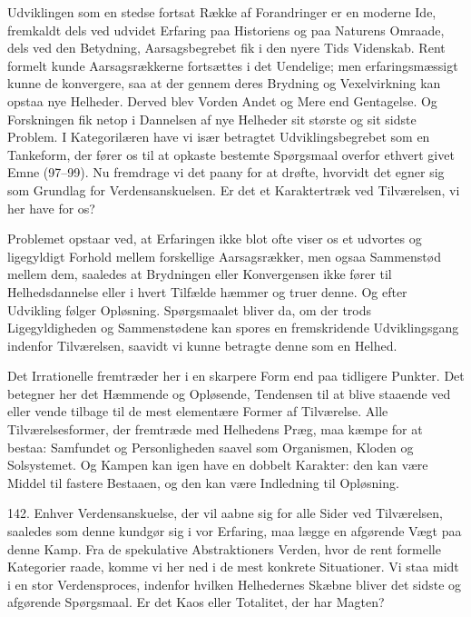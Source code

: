 \documentclass[12pt,a4paper]{book}
\newcommand{\apage}[1]{\marginnote{\footnotesize\textit{[#1]}}}
\begin{document}
Udviklingen som en stedse fortsat Række af Forandringer er en moderne Ide, fremkaldt dels
ved udvidet Erfaring paa Historiens og paa Naturens Omraade, dels ved den Betydning,
Aarsagsbegrebet fik i den nyere Tids Videnskab. Rent formelt kunde Aarsagsrækkerne
fortsættes i det Uendelige; men erfaringsmæssigt kunne de konvergere, saa at der gennem
deres Brydning og Vexelvirkning kan opstaa nye Helheder. Derved blev Vorden Andet og Mere
end Gentagelse. Og Forskningen fik netop i Dannelsen af nye Helheder sit største og sit
sidste Problem. I Kategorilæren have vi især betragtet Udviklingsbegrebet som en Tankeform,
der fører os til at opkaste bestemte Spørgsmaal overfor ethvert givet Emne (97--99). Nu
fremdrage vi det paany for at drøfte, hvorvidt det egner sig som Grundlag for
Verdensanskuelsen. Er det et Karaktertræk ved Tilværelsen, vi her have for os?

Problemet opstaar ved, at Erfaringen ikke blot ofte viser os et udvortes og ligegyldigt
Forhold mellem forskellige Aarsagsrækker, men ogsaa Sammenstød mellem dem, saaledes at
Brydningen eller Konvergensen ikke fører til Helhedsdannelse eller i hvert Tilfælde hæmmer
og truer denne. Og efter Udvikling følger Opløsning. Spørgsmaalet bliver da, om der trods
Ligegyldigheden og Sammenstødene kan \apage{340} spores en fremskridende Udviklingsgang indenfor
Tilværelsen, saavidt vi kunne betragte denne som en Helhed.

Det Irrationelle fremtræder her i en skarpere Form end paa tidligere Punkter. Det betegner
her det Hæmmende og Opløsende, Tendensen til at blive staaende ved eller vende tilbage til
de mest elementære Former af Tilværelse. Alle Tilværelsesformer, der fremtræde med
Helhedens Præg, maa kæmpe for at bestaa: Samfundet og Personligheden saavel som
Organismen, Kloden og Solsystemet. Og Kampen kan igen have en dobbelt Karakter: den kan
være Middel til fastere Bestaaen, og den kan være Indledning til Opløsning.

142. Enhver Verdensanskuelse, der vil aabne sig for alle Sider ved Tilværelsen, saaledes
som denne kundgør sig i vor Erfaring, maa lægge en afgørende Vægt paa denne Kamp. Fra de
spekulative Abstraktioners Verden, hvor de rent formelle Kategorier raade, komme vi her ned i de mest konkrete Situationer. Vi staa midt i en stor Verdensproces, indenfor hvilken
Helhedernes Skæbne bliver det sidste og afgørende Spørgsmaal. Er det Kaos eller Totalitet,
der har Magten?
\end{document}
